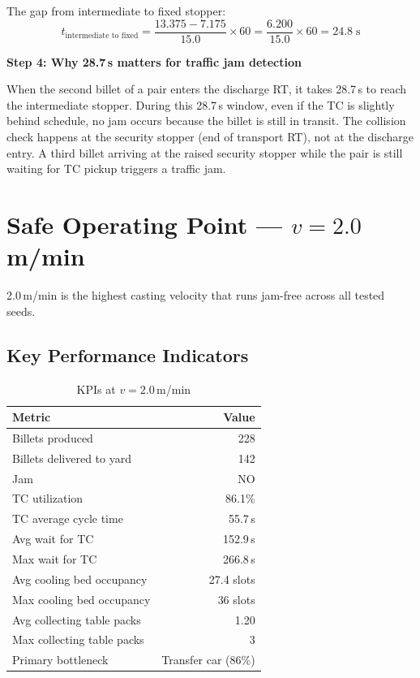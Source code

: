 \documentclass[11pt,a4paper]{article}
\begin{document}
The gap from intermediate to fixed stopper:
\begin{equation}
t_\text{intermediate to fixed} = \frac{13.375 - 7.175}{15.0} \times 60 = \frac{6.200}{15.0} \times 60 = 24.8\;\text{s}
\end{equation}

\textbf{Step 4: Why 28.7\,s matters for traffic jam detection}

When the second billet of a pair enters the discharge RT, it takes 28.7\,s to reach the intermediate stopper. During this 28.7\,s window, even if the TC is slightly behind schedule, no jam occurs because the billet is still in transit. The collision check happens at the security stopper (end of transport RT), not at the discharge entry. A third billet arriving at the raised security stopper while the pair is still waiting for TC pickup triggers a traffic jam.

\section{Safe Operating Point --- $v = 2.0$\,m/min}
\label{sec:safe-point}

2.0\,m/min is the highest casting velocity that runs jam-free across all tested seeds.

\subsection{Key Performance Indicators}

\begin{table}[H]
\centering
\caption{KPIs at $v = 2.0$\,m/min}
\label{tab:kpi-2.0}
\begin{tabular}{@{}lr@{}}
\toprule
Metric & Value \\
\midrule
Billets produced & 228 \\
Billets delivered to yard & 142 \\
Jam & NO \\
TC utilization & 86.1\% \\
TC average cycle time & 55.7\,s \\
Avg wait for TC & 152.9\,s \\
Max wait for TC & 266.8\,s \\
Avg cooling bed occupancy & 27.4 slots \\
Max cooling bed occupancy & 36 slots \\
Avg collecting table packs & 1.20 \\
Max collecting table packs & 3 \\
Primary bottleneck & Transfer car (86\%) \\
\bottomrule
\end{tabular}
\end{table}
\end{document}
